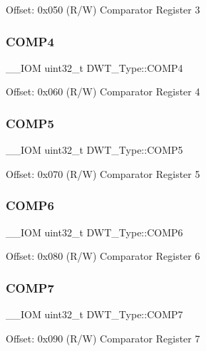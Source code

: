 Offset\+: 0x050 (R/W) Comparator Register 3 \mbox{\label{struct_d_w_t___type_a86bc7f4ad425a05b29978a6f97563783}} 
\subsubsection{\texorpdfstring{COMP4}{COMP4}}
{\footnotesize\ttfamily \+\_\+\+\_\+\+I\+OM uint32\+\_\+t D\+W\+T\+\_\+\+Type\+::\+C\+O\+M\+P4}

Offset\+: 0x060 (R/W) Comparator Register 4 \mbox{\label{struct_d_w_t___type_a07667ec9dd833ecab52bf2cf802d9acb}} 
\subsubsection{\texorpdfstring{COMP5}{COMP5}}
{\footnotesize\ttfamily \+\_\+\+\_\+\+I\+OM uint32\+\_\+t D\+W\+T\+\_\+\+Type\+::\+C\+O\+M\+P5}

Offset\+: 0x070 (R/W) Comparator Register 5 \mbox{\label{struct_d_w_t___type_a1256ac92acb94add255ff31aca31070d}} 
\subsubsection{\texorpdfstring{COMP6}{COMP6}}
{\footnotesize\ttfamily \+\_\+\+\_\+\+I\+OM uint32\+\_\+t D\+W\+T\+\_\+\+Type\+::\+C\+O\+M\+P6}

Offset\+: 0x080 (R/W) Comparator Register 6 \mbox{\label{struct_d_w_t___type_a46db6f5289d840f0b9886ae598352452}} 
\subsubsection{\texorpdfstring{COMP7}{COMP7}}
{\footnotesize\ttfamily \+\_\+\+\_\+\+I\+OM uint32\+\_\+t D\+W\+T\+\_\+\+Type\+::\+C\+O\+M\+P7}

Offset\+: 0x090 (R/W) Comparator Register 7 \mbox{\label{struct_d_w_t___type_aee138bc70746585e4ccf62557954c07f}} 
